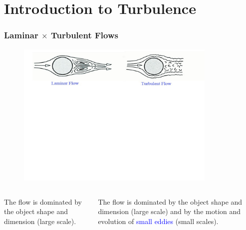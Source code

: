 \documentclass[10pt,compress]{beamer}
\newcommand{\blue}{\textcolor{blue}}
\begin{document}
\section{Introduction to Turbulence}

\begin{frame}
 \frametitle{Laminar $\times$ Turbulent Flows}
   \begin{figure}%
    \begin{center}
     \includegraphics[width=9.cm, height=7cm, clip]{./Figs/Transition2Turbulence2b}
    \end{center}
   \end{figure}    
  \vspace{-5cm}
  \begin{columns}
    \begin{column}[l]{0.5\linewidth}
        The flow is dominated by the object shape and dimension (large scale).
    \end{column}
    \begin{column}[l]{0.5\linewidth}
      The flow is dominated by the object shape and dimension (large scale) and by the motion and evolution of \blue{small eddies} (small scales).
    \end{column}
  \end{columns}

\end{frame}
\end{document}
